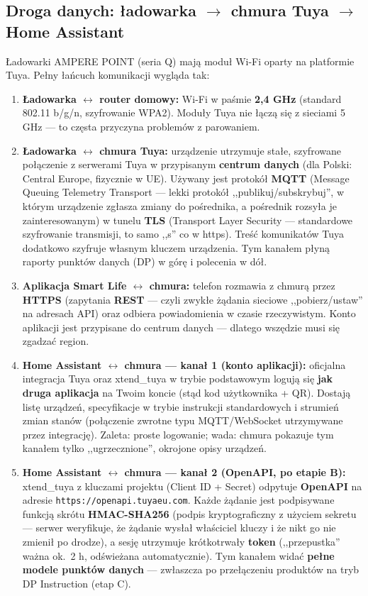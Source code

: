 \documentclass[11pt,a4paper]{article}
\begin{document}
\subsection{Droga danych: ładowarka $\to$ chmura Tuya $\to$ Home Assistant}

Ładowarki AMPERE POINT (seria Q) mają moduł Wi-Fi oparty na platformie Tuya. Pełny łańcuch komunikacji wygląda tak:

\begin{enumerate}
\item \textbf{Ładowarka $\leftrightarrow$ router domowy:} Wi-Fi w paśmie \textbf{2,4 GHz} (standard 802.11 b/g/n, szyfrowanie WPA2). Moduły Tuya nie łączą się z sieciami 5 GHz --- to częsta przyczyna problemów z parowaniem.
\item \textbf{Ładowarka $\leftrightarrow$ chmura Tuya:} urządzenie utrzymuje stałe, szyfrowane połączenie z serwerami Tuya w przypisanym \textbf{centrum danych} (dla Polski: Central Europe, fizycznie w UE). Używany jest protokół \textbf{MQTT} (Message Queuing Telemetry Transport --- lekki protokół ,,publikuj/subskrybuj'', w którym urządzenie zgłasza zmiany do pośrednika, a pośrednik rozsyła je zainteresowanym) w tunelu \textbf{TLS} (Transport Layer Security --- standardowe szyfrowanie transmisji, to samo ,,s'' co w https). Treść komunikatów Tuya dodatkowo szyfruje własnym kluczem urządzenia. Tym kanałem płyną raporty punktów danych (DP) w górę i polecenia w dół.
\item \textbf{Aplikacja Smart Life $\leftrightarrow$ chmura:} telefon rozmawia z chmurą przez \textbf{HTTPS} (zapytania \textbf{REST} --- czyli zwykłe żądania sieciowe ,,pobierz/ustaw'' na adresach API) oraz odbiera powiadomienia w czasie rzeczywistym. Konto aplikacji jest przypisane do centrum danych --- dlatego wszędzie musi się zgadzać region.
\item \textbf{Home Assistant $\leftrightarrow$ chmura --- kanał 1 (konto aplikacji):} oficjalna integracja Tuya oraz xtend\_tuya w trybie podstawowym logują się \textbf{jak druga aplikacja} na Twoim koncie (stąd kod użytkownika + QR). Dostają listę urządzeń, specyfikacje w trybie instrukcji standardowych i strumień zmian stanów (połączenie zwrotne typu MQTT/WebSocket utrzymywane przez integrację). Zaleta: proste logowanie; wada: chmura pokazuje tym kanałem tylko ,,ugrzecznione'', okrojone opisy urządzeń.
\item \textbf{Home Assistant $\leftrightarrow$ chmura --- kanał 2 (OpenAPI, po etapie B):} xtend\_tuya z kluczami projektu (Client ID + Secret) odpytuje \textbf{OpenAPI} na adresie \texttt{https://openapi.tuyaeu.com}. Każde żądanie jest podpisywane funkcją skrótu \textbf{HMAC-SHA256} (podpis kryptograficzny z użyciem sekretu --- serwer weryfikuje, że żądanie wysłał właściciel kluczy i że nikt go nie zmienił po drodze), a sesję utrzymuje krótkotrwały \textbf{token} (,,przepustka'' ważna ok.~2 h, odświeżana automatycznie). Tym kanałem widać \textbf{pełne modele punktów danych} --- zwłaszcza po przełączeniu produktów na tryb DP Instruction (etap C).
\end{enumerate}
\end{document}
